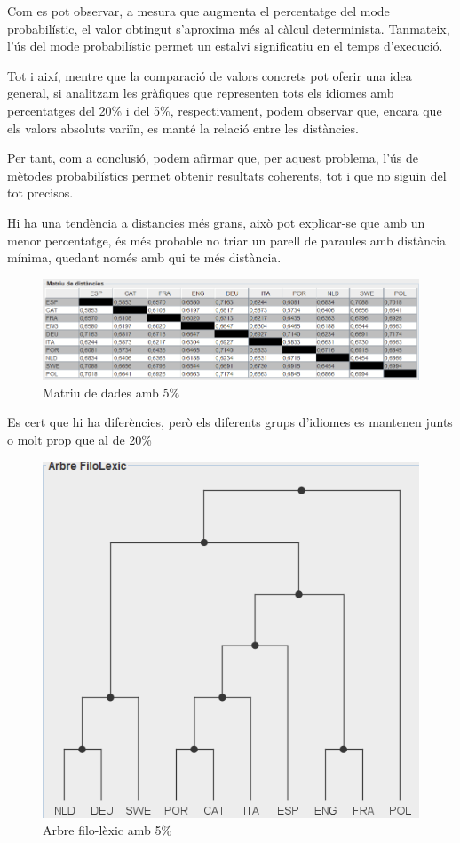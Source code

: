 \documentclass{ieeetj}
\begin{document}
Com es pot observar, a mesura que augmenta el percentatge del mode probabilístic, el valor obtingut s'aproxima més al càlcul determinista. Tanmateix, l'ús del mode probabilístic permet un estalvi significatiu en el temps d'execució.

Tot i així, mentre que la comparació de valors concrets pot oferir una idea general, si analitzam les gràfiques que representen tots els idiomes amb percentatges del 20\% i del 5\%, respectivament, podem observar que, encara que els valors absoluts variïn, es manté la relació entre les distàncies.

Per tant, com a conclusió, podem afirmar que, per aquest problema, l'ús de mètodes probabilístics permet obtenir resultats coherents, tot i que no siguin del tot precisos.


Hi ha una tendència a distancies més grans, això pot explicar-se que amb un menor percentatge, és més probable no triar un parell de paraules amb distància mínima, quedant només amb qui te més distància. 
\begin{figure}[H]
    \centering
    \includegraphics[width=\linewidth]{png/taula5.png}
    \caption{Matriu de dades amb 5\%}
    \label{fig:enter-label}
\end{figure}

Es cert que hi ha diferències, però els diferents grups d'idiomes es mantenen junts o molt prop que al de 20\% 
\begin{figure}[H]
    \centering
    \includegraphics[width=\linewidth]{png/filolexic5.png}
    \caption{Arbre filo-lèxic amb 5\%}
    \label{fig:enter-label}
\end{figure}
\end{document}
